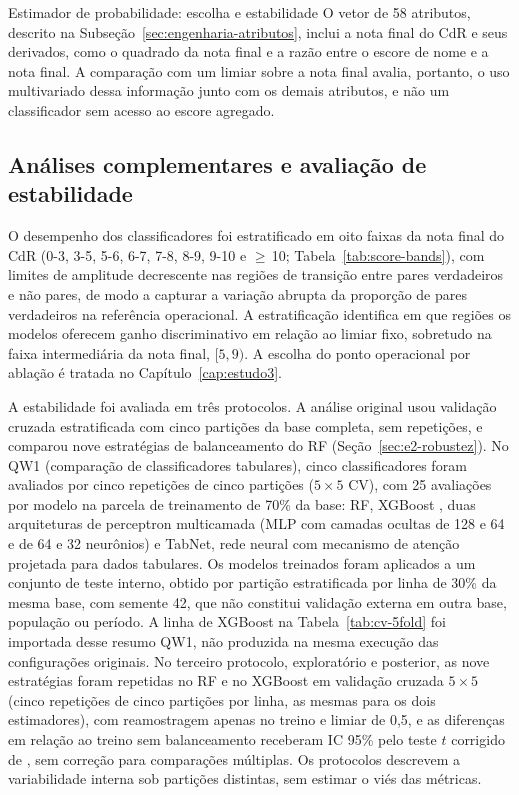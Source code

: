 \begin{chapter}{Estimador de probabilidade: escolha e estabilidade}
O vetor de 58 atributos, descrito na Subseção~\ref{sec:engenharia-atributos}, inclui a nota final do CdR e seus derivados, como o quadrado da nota final e a razão entre o escore de nome e a nota final. A comparação com um limiar sobre a nota final avalia, portanto, o uso multivariado dessa informação junto com os demais atributos, e não um classificador sem acesso ao escore agregado.

\subsection{Análises complementares e avaliação de estabilidade}\label{sec:analises-complementares}

O desempenho dos classificadores foi estratificado em oito faixas da nota final do CdR (0-3, 3-5, 5-6, 6-7, 7-8, 8-9, 9-10 e $\geq$\,10; Tabela~\ref{tab:score-bands}), com limites de amplitude decrescente nas regiões de transição entre pares verdadeiros e não pares, de modo a capturar a variação abrupta da proporção de pares verdadeiros na referência operacional. A estratificação identifica em que regiões os modelos oferecem ganho discriminativo em relação ao limiar fixo, sobretudo na faixa intermediária da nota final, $[5,9)$. A escolha do ponto operacional por ablação é tratada no Capítulo~\ref{cap:estudo3}.

A estabilidade foi avaliada em três protocolos. A análise original usou validação cruzada estratificada com cinco partições da base completa, sem repetições, e comparou nove estratégias de balanceamento do RF (Seção~\ref{sec:e2-robustez}). No QW1 (comparação de classificadores tabulares), cinco classificadores foram avaliados por cinco repetições de cinco partições ($5 \times 5$ CV), com 25 avaliações por modelo na parcela de treinamento de 70\% da base: RF, XGBoost \cite{Chen2016xgboost}, duas arquiteturas de perceptron multicamada (MLP com camadas ocultas de 128 e 64 e de 64 e 32 neurônios) e TabNet, rede neural com mecanismo de atenção projetada para dados tabulares. Os modelos treinados foram aplicados a um conjunto de teste interno, obtido por partição estratificada por linha de 30\% da mesma base, com semente 42, que não constitui validação externa em outra base, população ou período. A linha de XGBoost na Tabela~\ref{tab:cv-5fold} foi importada desse resumo QW1, não produzida na mesma execução das configurações originais. No terceiro protocolo, exploratório e posterior, as nove estratégias foram repetidas no RF e no XGBoost em validação cruzada $5 \times 5$ (cinco repetições de cinco partições por linha, as mesmas para os dois estimadores), com reamostragem apenas no treino e limiar de 0,5, e as diferenças em relação ao treino sem balanceamento receberam IC 95\% pelo teste $t$ corrigido de , sem correção para comparações múltiplas. Os protocolos descrevem a variabilidade interna sob partições distintas, sem estimar o viés das métricas.


\end{chapter}
